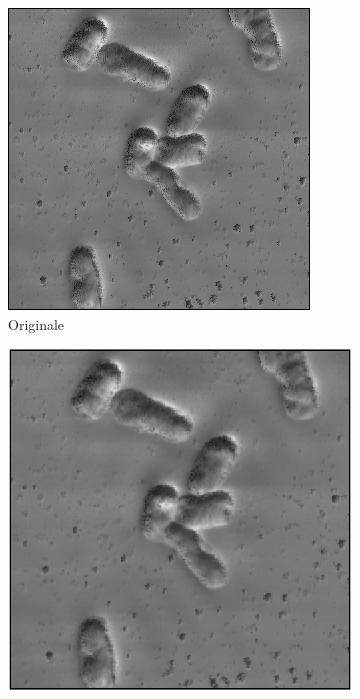 \documentclass[../main.tex]{subfiles}
\begin{document}
\begin{enumerate}
		\begin{figure}[ht]
			\centering
			\begin{subfigure}{0.4\linewidth}
				\includegraphics[keepaspectratio, width=\linewidth]{images/ec_o2a.png}
				\caption{Originale}
			\end{subfigure}
			\hspace{10pt}
			\begin{subfigure}{0.4\linewidth}
				\includegraphics[keepaspectratio, width=\linewidth]{images/gauss_05.png}

\end{subfigure}
\end{figure}
\end{enumerate}
\end{document}
